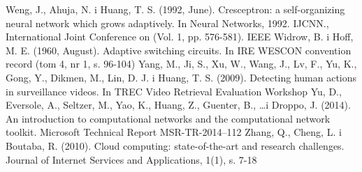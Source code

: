 \documentclass[12pt,a4paper,twoside]{article}
\begin{document}
\begin{thebibliography}{99}
 Weng, J., Ahuja, N. i Huang, T. S. (1992, June). Cresceptron: a self-organizing neural network which grows adaptively. In Neural Networks, 1992. IJCNN., International Joint Conference on (Vol. 1, pp. 576-581). IEEE
 Widrow, B. i Hoff, M. E. (1960, August). Adaptive switching circuits. In IRE WESCON convention record (tom 4, nr 1, s. 96-104)
 Yang, M., Ji, S., Xu, W., Wang, J., Lv, F., Yu, K., Gong, Y., Dikmen, M., Lin, D. J. i Huang, T. S. (2009). Detecting human actions in surveillance videos. In TREC Video Retrieval Evaluation Workshop
 Yu, D., Eversole, A., Seltzer, M., Yao, K., Huang, Z., Guenter, B., \ldots i Droppo, J. (2014). An introduction to computational networks and the computational network toolkit. Microsoft Technical Report MSR-TR-2014–112
 Zhang, Q., Cheng, L. i Boutaba, R. (2010). Cloud computing: state-of-the-art and research challenges. Journal of Internet Services and Applications, 1(1), s. 7-18

\end{thebibliography}
\clearpage

\listoffigures

\clearpage

\listoftables

\clearpage
\end{document}
